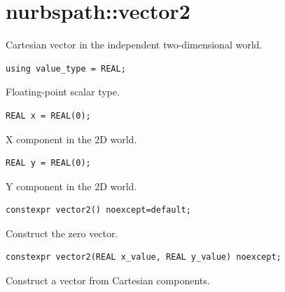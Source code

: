 \section{nurbspath::vector2}
Cartesian vector in the independent two-dimensional world.
\par\noindent\begin{minipage}{\linewidth}
\begin{lstlisting}[style=apireference]
using value_type = REAL;
\end{lstlisting}
{\footnotesize Floating-point scalar type.\par}
\end{minipage}\par\vspace{1pt}
\par\noindent\begin{minipage}{\linewidth}
\begin{lstlisting}[style=apireference]
REAL x = REAL(0);
\end{lstlisting}
{\footnotesize X component in the 2D world.\par}
\end{minipage}\par\vspace{1pt}
\par\noindent\begin{minipage}{\linewidth}
\begin{lstlisting}[style=apireference]
REAL y = REAL(0);
\end{lstlisting}
{\footnotesize Y component in the 2D world.\par}
\end{minipage}\par\vspace{1pt}
\par\noindent\begin{minipage}{\linewidth}
\begin{lstlisting}[style=apireference]
constexpr vector2() noexcept=default;
\end{lstlisting}
{\footnotesize Construct the zero vector.\par}
\end{minipage}\par\vspace{1pt}
\par\noindent\begin{minipage}{\linewidth}
\begin{lstlisting}[style=apireference]
constexpr vector2(REAL x_value, REAL y_value) noexcept;
\end{lstlisting}
{\footnotesize Construct a vector from Cartesian components.\par}
\end{minipage}\par\vspace{1pt}
